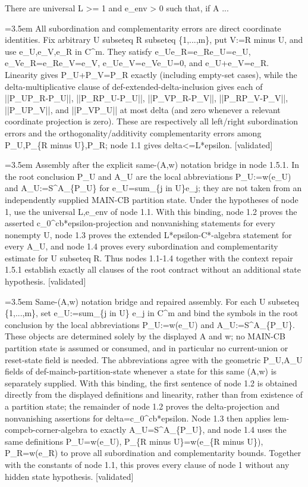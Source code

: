 \documentclass{article}
\newcommand{\step}[1]{\par\noindent\hangindent=3.5em\hangafter=1%
  \makebox[3.5em][l]{\textbf{#1.}}}
\newcommand{\steptag}[1]{\hfill{\small\textsf{[#1]}}}
\begin{document}
\begin{proofbox}{There are universal L >= 1 and e\_env > 0 such that, if A ...}
\step{1.4} All subordination and complementarity errors are direct coordinate identities. Fix arbitrary U subseteq R subseteq \{1,...,m\}, put V:=R minus U, and use e\_U,e\_V,e\_R in C\textasciicircum{}m. They satisfy e\_Ue\_R=e\_Re\_U=e\_U, e\_Ve\_R=e\_Re\_V=e\_V, e\_Ue\_V=e\_Ve\_U=0, and e\_U+e\_V=e\_R. Linearity gives P\_U+P\_V=P\_R exactly (including empty-set cases), while the delta-multiplicative clause of def-extended-delta-inclusion gives each of ||P\_UP\_R-P\_U||, ||P\_RP\_U-P\_U||, ||P\_VP\_R-P\_V||, ||P\_RP\_V-P\_V||, ||P\_UP\_V||, and ||P\_VP\_U|| at most delta (and zero whenever a relevant coordinate projection is zero). These are respectively all left/right subordination errors and the orthogonality/additivity complementarity errors among P\_U,P\_\{R minus U\},P\_R; node 1.1 gives delta<=L*epsilon. \steptag{validated} \\[4pt]
\step{1.5} Assembly after the explicit same-(A,w) notation bridge in node 1.5.1. In the root conclusion P\_U and A\_U are the local abbreviations P\_U:=w(e\_U) and A\_U:=S\textasciicircum{}A\_\{P\_U\} for e\_U=sum\_\{j in U\}e\_j; they are not taken from an independently supplied MAIN-CB partition state. Under the hypotheses of node 1, use the universal L,e\_env of node 1.1. With this binding, node 1.2 proves the asserted c\_0\textasciicircum{}cb*epsilon-projection and nonvanishing statements for every nonempty U, node 1.3 proves the extended L*epsilon-C*-algebra statement for every A\_U, and node 1.4 proves every subordination and complementarity estimate for U subseteq R. Thus nodes 1.1-1.4 together with the context repair 1.5.1 establish exactly all clauses of the root contract without an additional state hypothesis. \steptag{validated} \\[6pt]
\step{1.5.1} Same-(A,w) notation bridge and repaired assembly. For each U subseteq \{1,...,m\}, set e\_U:=sum\_\{j in U\} e\_j in C\textasciicircum{}m and bind the symbols in the root conclusion by the local abbreviations P\_U:=w(e\_U) and A\_U:=S\textasciicircum{}A\_\{P\_U\}. These objects are determined solely by the displayed A and w; no MAIN-CB partition state is assumed or consumed, and in particular no current-union or reset-state field is needed. The abbreviations agree with the geometric P\_U,A\_U fields of def-maincb-partition-state whenever a state for this same (A,w) is separately supplied. With this binding, the first sentence of node 1.2 is obtained directly from the displayed definitions and linearity, rather than from existence of a partition state; the remainder of node 1.2 proves the delta-projection and nonvanishing assertions for delta=c\_0\textasciicircum{}cb*epsilon. Node 1.3 then applies lem-compcb-corner-algebra to exactly A\_U=S\textasciicircum{}A\_\{P\_U\}, and node 1.4 uses the same definitions P\_U=w(e\_U), P\_\{R minus U\}=w(e\_\{R minus U\}), P\_R=w(e\_R) to prove all subordination and complementarity bounds. Together with the constants of node 1.1, this proves every clause of node 1 without any hidden state hypothesis. \steptag{validated} \\[4pt]
\end{proofbox}
\end{document}
